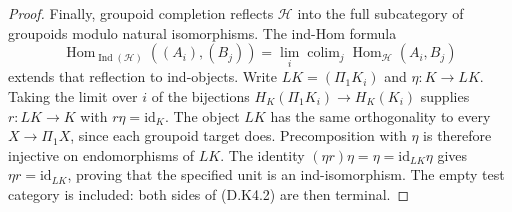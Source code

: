 \begin{proof}
Finally, groupoid completion reflects $\mathcal H$ into the
full subcategory of groupoids modulo natural isomorphisms.
The ind-Hom formula
\[
 \operatorname{Hom}_{\operatorname{Ind}(\mathcal H)}
       ((A_i),(B_j))
   =\lim_i\operatorname{colim}_j
            \operatorname{Hom}_{\mathcal H}(A_i,B_j)
\]
extends that reflection to ind-objects. Write $L K=(\Pi_1K_i)$
and $\eta:K\to LK$. Taking the limit over $i$ of the
bijections $H_K(\Pi_1K_i)\to H_K(K_i)$ supplies
$r:LK\to K$ with $r\eta=\mathrm{id}_K$. The object $LK$ has
the same orthogonality to every $X\to\Pi_1X$, since each
groupoid target does. Precomposition with $\eta$ is therefore
injective on endomorphisms of $LK$. The identity
$(\eta r)\eta=\eta=\mathrm{id}_{LK}\eta$ gives
$\eta r=\mathrm{id}_{LK}$, proving that the specified unit
is an ind-isomorphism. The empty test category is included:
both sides of (D.K4.2) are then terminal.
\end{proof}

